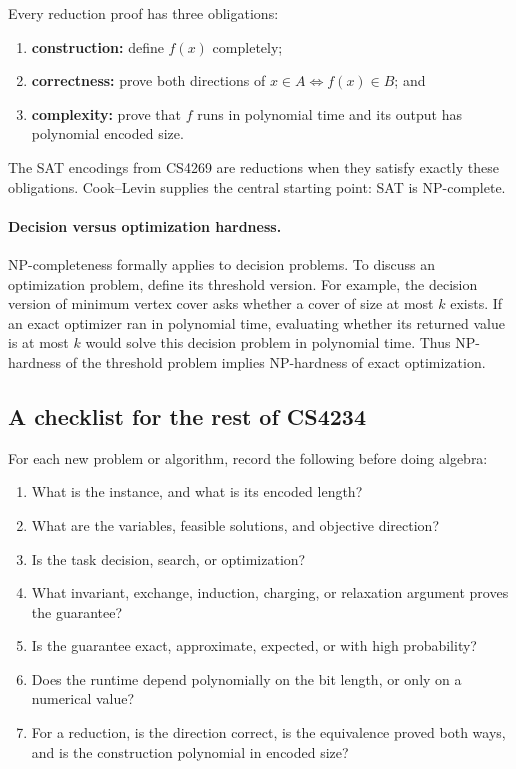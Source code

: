 \documentclass[10pt]{article}
\theoremstyle{definition}
\begin{document}
Every reduction proof has three obligations:
\begin{enumerate}
  \item \textbf{construction:} define $f(x)$ completely;
  \item \textbf{correctness:} prove both directions of
        $x\in A\iff f(x)\in B$; and
  \item \textbf{complexity:} prove that $f$ runs in polynomial time and its
        output has polynomial encoded size.
\end{enumerate}
The SAT encodings from CS4269 are reductions when they satisfy exactly these
obligations.  Cook--Levin supplies the central starting point: SAT is
NP-complete.

\paragraph{Decision versus optimization hardness.}
NP-completeness formally applies to decision problems.  To discuss an
optimization problem, define its threshold version.  For example, the
decision version of minimum vertex cover asks whether a cover of size at most
$k$ exists.  If an exact optimizer ran in polynomial time, evaluating whether
its returned value is at most $k$ would solve this decision problem in
polynomial time.  Thus NP-hardness of the threshold problem implies NP-hardness
of exact optimization.

\subsection{A checklist for the rest of CS4234}

For each new problem or algorithm, record the following before doing algebra:
\begin{enumerate}
  \item What is the instance, and what is its encoded length?
  \item What are the variables, feasible solutions, and objective direction?
  \item Is the task decision, search, or optimization?
  \item What invariant, exchange, induction, charging, or relaxation argument
        proves the guarantee?
  \item Is the guarantee exact, approximate, expected, or with high
        probability?
  \item Does the runtime depend polynomially on the bit length, or only on a
        numerical value?
  \item For a reduction, is the direction correct, is the equivalence proved
        both ways, and is the construction polynomial in encoded size?
\end{enumerate}
\end{document}
